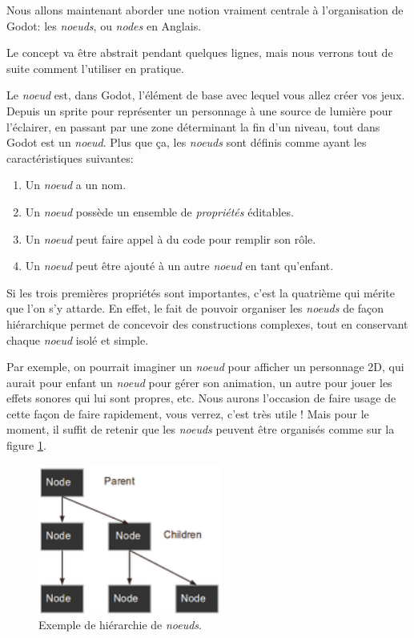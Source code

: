 Nous allons maintenant aborder une notion vraiment centrale à l'organisation de Godot: les \emph{noeuds}, ou \emph{nodes} en Anglais.

Le concept va être abstrait pendant quelques lignes, mais nous verrons tout de suite comment l'utiliser en pratique.

Le \emph{noeud} est, dans Godot, l'élément de base avec lequel vous allez créer vos jeux. Depuis un sprite pour représenter un personnage à une source de lumière pour l'éclairer, en passant par une zone déterminant la fin d'un niveau, tout dans Godot est un \emph{noeud}. Plus que ça, les \emph{noeuds} sont définis comme ayant les caractéristiques suivantes:

\begin{enumerate}
\item Un \emph{noeud} a un nom.
\item Un \emph{noeud} possède un ensemble de \emph{propriétés} éditables.
\item Un \emph{noeud} peut faire appel à du code pour remplir son rôle.
\item Un \emph{noeud} peut être ajouté à un autre \emph{noeud} en tant qu'enfant.  
\end{enumerate}

Si les trois premières propriétés sont importantes, c'est la quatrième qui mérite que l'on s'y attarde. En effet, le fait de pouvoir organiser les \emph{noeuds} de façon hiérarchique permet de concevoir des constructions complexes, tout en conservant chaque \emph{noeud} isolé et simple.

Par exemple, on pourrait imaginer un \emph{noeud} pour afficher un personnage 2D, qui aurait pour enfant un \emph{noeud} pour gérer son animation, un autre pour jouer les effets sonores qui lui sont propres, etc. Nous aurons l'occasion de faire usage de cette façon de faire rapidement, vous verrez, c'est très utile ! Mais pour le moment, il suffit de retenir que les \emph{noeuds} peuvent être organisés comme sur la figure \ref{lvl1-nodetree}.

\begin{figure}
  \begin{center}
    \includegraphics[width=6cm]{img/lvl1-nodetree.png}
  \end{center}
  \caption{\label{lvl1-nodetree} Exemple de hiérarchie de \emph{noeuds}.}
\end{figure}

